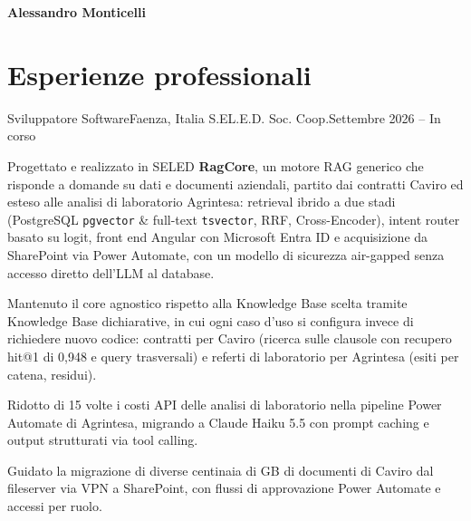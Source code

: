 \documentclass[letterpaper,11pt,italian]{article}
\begin{document}
\setlength{\footskip}{5pt}
\centering\textbf{\Large Alessandro Monticelli} \\
\vspace{0.08in}

\section{Esperienze professionali}
\resumeSubHeadingListStart
\resumeSubheading
{Sviluppatore Software}{Faenza, Italia}
{S.EL.E.D. Soc. Coop.}{Settembre 2026 -- In corso}
\resumeItemListStart
  \item\small{Progettato e realizzato in SELED \textbf{RagCore}, un motore RAG generico che risponde a domande su dati e documenti aziendali, partito dai contratti Caviro ed esteso alle analisi di laboratorio Agrintesa: retrieval ibrido a due stadi (PostgreSQL \texttt{pgvector} \& full-text \texttt{tsvector}, RRF, Cross-Encoder), intent router basato su logit, front end Angular con Microsoft Entra ID e acquisizione da SharePoint via Power Automate, con un modello di sicurezza air-gapped senza accesso diretto dell'LLM al database.}
  \item\small{Mantenuto il core agnostico rispetto alla Knowledge Base scelta tramite Knowledge Base dichiarative, in cui ogni caso d'uso si configura invece di richiedere nuovo codice: contratti per Caviro (ricerca sulle clausole con recupero hit@1 di 0,948 e query trasversali) e referti di laboratorio per Agrintesa (esiti per catena, residui).}
  \item\small{Ridotto di 15 volte i costi API delle analisi di laboratorio nella pipeline Power Automate di Agrintesa, migrando a Claude Haiku 5.5 con prompt caching e output strutturati via tool calling.}
  \item\small{Guidato la migrazione di diverse centinaia di GB di documenti di Caviro dal fileserver via VPN a SharePoint, con flussi di approvazione Power Automate e accessi per ruolo.}
\end{document}
